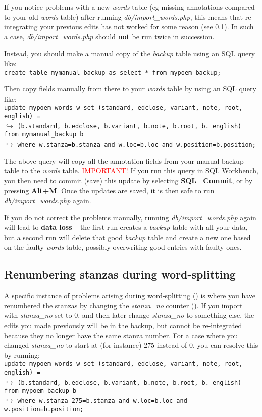If you notice problems with a new \textit{words} table (eg missing annotations compared to your old \textit{words} table) after running \textit{db/import_words.php}, this means that re-integrating your previous edits has not worked for some reason (see \cref{ss:renumber}).  In such a case, \textit{db/import_words.php} should \textbf{not} be run twice in succession.  

Instead, you should make a manual copy of the \textit{backup} table using an SQL query like:  \\
\verb|create table mymanual_backup as select * from mypoem_backup;|

Then copy fields manually from there to your \textit{words} table by using an SQL query like:\\
\verb|update mypoem_words w set (standard, edclose, variant, note, root, english) = |\\
$\hookrightarrow$ \verb|(b.standard, b.edclose, b.variant, b.note, b.root, b. english) from mymanual_backup b|\\
$\hookrightarrow$ \verb|where w.stanza=b.stanza and w.loc=b.loc and w.position=b.position;|

The above query will copy all the annotation fields from your manual backup table to the \textit{words} table.  \textcolor{red}{IMPORTANT!} If you run this query in SQL Workbench, you then need to commit (save) this update by selecting \textbf{SQL \textrightarrow\ Commit}, or by pressing \textbf{Alt+M}.  Once the updates are saved, it is then safe to run \textit{db/import_words.php} again.  

If you do not correct the problems manually, running \textit{db/import_words.php} again will lead to \textbf{data loss} -- the first run creates a \textit{backup} table with all your data, but a second run will delete that good \textit{backup} table and create a new one based on the faulty \textit{words} table, possibly overwriting good entries with faulty ones. 

\subsection{Renumbering stanzas during word-splitting}
\label{ss:renumber}

A specific instance of problems arising during word-splitting () is where you have renumbered the stanzas by changing the \textit{stanza_no} counter ().  If you import with \textit{stanza_no} set to 0, and then later change \textit{stanza_no} to something else, the edits you made previously will be in the backup, but cannot be re-integrated because they no longer have the same stanza number.  For a case where you changed \textit{stanza_no} to start at (for instance) 275 instead of 0, you can resolve this by running:\\
\verb|update mypoem_words w set (standard, edclose, variant, note, root, english) = |\\
$\hookrightarrow$ \verb|(b.standard, b.edclose, b.variant, b.note, b.root, b. english) from mypoem_backup b|\\
$\hookrightarrow$ \verb|where w.stanza-275=b.stanza and w.loc=b.loc and w.position=b.position;|

